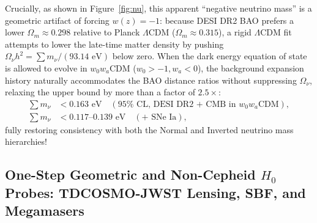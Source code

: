 \documentclass[aps,prd,preprint,superscriptaddress,nofootinbib]{revtex4-2}
\begin{document}


Crucially, as shown in Figure~\ref{fig:nu}, this apparent ``negative neutrino mass'' is a geometric artifact of forcing $w(z) = -1$: because DESI DR2 BAO prefers a lower $\Omega_m \approx 0.298$ relative to Planck $\Lambda$CDM ($\Omega_m \approx 0.315$), a rigid $\Lambda$CDM fit attempts to lower the late-time matter density by pushing $\Omega_\nu h^2 = \sum m_\nu / (93.14\text{ eV})$ below zero. When the dark energy equation of state is allowed to evolve in $w_0 w_a$CDM ($w_0 > -1, w_a < 0$), the background expansion history naturally accommodates the BAO distance ratios without suppressing $\Omega_\nu$, relaxing the upper bound by more than a factor of $2.5\times$:
\begin{equation}
\begin{aligned}
    \sum m_\nu &< 0.163\text{ eV}\quad (95\%\text{ CL, DESI DR2 + CMB in }w_0 w_a\text{CDM}), \\[4pt]
    \sum m_\nu &< 0.117\text{--}0.139\text{ eV}\quad (\text{+ SNe Ia}),
\end{aligned}
    \label{m:eq:desi_dr2_mnu_w0wa}
\end{equation}
fully restoring consistency with both the Normal and Inverted neutrino mass hierarchies!

\subsection{One-Step Geometric and Non-Cepheid $H_0$ Probes: TDCOSMO-JWST Lensing, SBF, and Megamasers}
\end{document}
